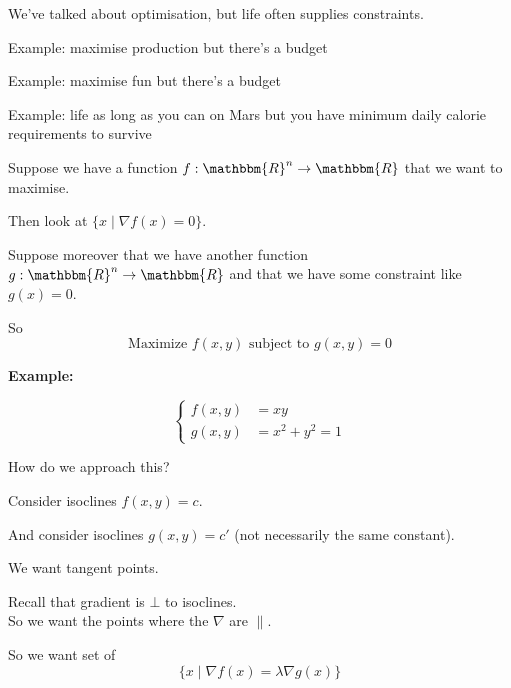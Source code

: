 
\usepackage{epsfig}
\usepackage{bbm}










We've talked about optimisation, but life often supplies constraints.

Example: maximise production but there's a budget

Example: maximise fun but there's a budget

Example: life as long as you can on Mars but you have minimum daily
calorie requirements to survive

\bigskip

Suppose we have a function $f : \mathbbm{R}^n \rightarrow
\mathbbm{R}$ that we want to maximise.

Then look at $\{x\mid \nabla f(x) = 0 \}$.

\medskip

Suppose moreover that we have another function $g : \mathbbm{R}^n
\rightarrow \mathbbm{R}$ and that we have some constraint like
$g(x)=0$.

So
\begin{displaymath}
  \mbox{Maximize } f(x,y) \mbox{ subject to } g(x,y) = 0
\end{displaymath}

\textbf{Example:}

\begin{equation}
\begin{cases}
  f(x,y) & = xy \\
  g(x,y) & = x^2 + y^2 = 1
\end{cases}
\end{equation}

How do we approach this?

Consider isoclines $f(x,y) = c$.

And consider isoclines $g(x,y) = c'$ (not necessarily the same
constant).

We want tangent points.

Recall that gradient is $\bot$ to isoclines.\\
So we want the points where the $\nabla$ are $\parallel$.

So we want set of
\begin{displaymath}
  \{ x \mid \nabla f(x) = \lambda \nabla g(x) \}
\end{displaymath}

